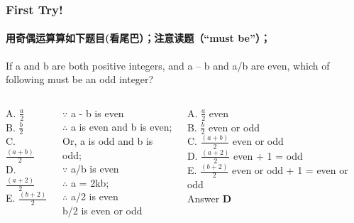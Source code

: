 \documentclass[
	11pt, %
]{beamer}
\begin{document}
\begin{frame}
	\frametitle{First Try!}
	\framesubtitle{用奇偶运算算如下题目(看尾巴）；注意读题（“must be”）；}
If a and b are both positive integers, and a – b and a/b are even, which of following must be an odd integer?\\
	\begin{columns}[t] %
		\begin{column}{0.2\textwidth} %
A. $\frac{a}{2}$\\
B. $\frac{b}{2}$\\
C. $\frac{(a + b)}{2}$\\
D. $\frac{(a + 2)}{2}$\\
E. $\frac{(b + 2)}{2}$\\
		\end{column}

\begin{column}{0.4\textwidth}
\pause
$\because$ a - b is even \\
$\therefore$ a is even and b is even; \\ 
Or, a is odd and b is odd; \\ 

\bigskip
$\because$ a/b is even \\
 $\therefore$ a = 2kb; \\
$\therefore$ a/2 is even\\
b/2 is even or odd\\
\end{column}

\begin{column}{0.4\textwidth} %
		\pause 
A. $\frac{a}{2}$ even\\
B. $\frac{b}{2}$ even or odd\\
C. $\frac{(a + b)}{2}$ even or odd\\
D. $\frac{(a + 2)}{2}$ even + 1 = odd\\
E. $\frac{(b + 2)}{2}$ even or odd + 1 = even or odd\\
\bigskip
Answer \textbf{D}
\end{column}
\end{columns}

\end{frame}
\end{document}
